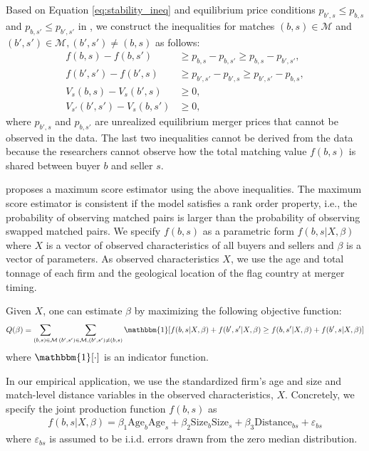 \documentclass[10pt]{article}
\begin{document}
Based on Equation \eqref{eq:stability_ineq} and equilibrium price conditions $p_{b',s}\le p_{b,s}$ and $p_{b,s'}\le p_{b',s'}$ in \cite{akkus2015ms}, we construct the inequalities for matches $(b,s)\in \mathcal{M}$ and $(b',s')\in \mathcal{M}, (b',s')\neq(b,s)$ as follows:
\begin{align}
    f(b,s)-f(b,s')&\ge p_{b,s}-p_{b,s'}\ge p_{b,s}-p_{b',s'},\label{eq:pairwise_stable_ineq}\\
    f(b',s')-f(b',s)&\ge p_{b',s'}-p_{b',s}\ge p_{b',s'}-p_{b,s},\nonumber\\
    V_s(b,s)-V_s(b',s)&\ge 0,\nonumber\\
    V_{s'}(b',s')-V_s(b,s')&\ge 0,\nonumber
\end{align}
where $p_{b',s}$ and $p_{b,s'}$ are unrealized equilibrium merger prices that cannot be observed in the data. The last two inequalities cannot be derived from the data because the researchers cannot observe how the total matching value $f(b,s)$ is shared between buyer $b$ and seller $s$.

\cite{fox2018qe} proposes a maximum score
estimator using the above inequalities. The maximum score estimator is consistent if the model satisfies a rank order property, i.e., the probability of observing matched pairs is larger than the probability of observing swapped matched pairs. We specify $f(b,s)$ as a parametric form $f(b,s|X,\beta)$ where $X$ is a vector of observed characteristics of all buyers and sellers and $\beta$ is a vector of parameters. As observed characteristics $X$, we use the age and total tonnage of each firm and the geological location of the flag country at merger timing.


Given $X$, one can estimate $\beta$ by maximizing the following objective function:
\begin{align}
    Q(\beta)=\sum_{(b,s)\in \mathcal{M}} \sum_{(b',s')\in \mathcal{M},(b',s')\neq (b,s)} \mathbbm{1}[f(b,s|X,\beta)+ f(b',s'|X,\beta)\ge f(b,s'|X,\beta)+f(b',s|X,\beta)]\label{eq:score_function}
\end{align}
where $\mathbbm{1}[\cdot]$ is an indicator function.

In our empirical application, we use the standardized firm's age and size and match-level distance variables in the observed characteristics, $X$. 
Concretely, we specify the joint production function $f(b,s)$ as
\begin{align*}
    f(b,s|X,\beta)= \beta_1 \text{Age}_{b}\text{Age}_{s} + \beta_2 \text{Size}_{b}\text{Size}_{s} + \beta_3 \text{Distance}_{bs} + \varepsilon_{bs}
\end{align*}
where $\varepsilon_{bs}$ is assumed to be i.i.d. errors drawn from the zero median distribution. 
\end{document}
